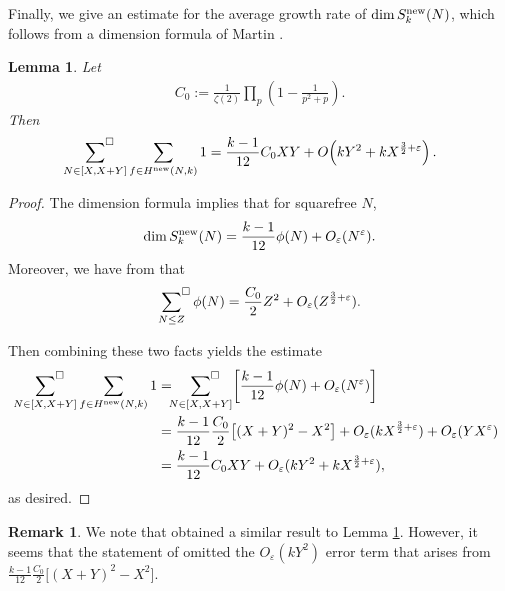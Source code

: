 \documentclass[12pt,letterpaper,reqno]{amsart}
\theoremstyle{plain}
\newtheorem{lemma}[theorem]{Lemma}
\theoremstyle{definition}
\newtheorem{remark}[theorem]{Remark}
\numberwithin{equation}{section}
\numberwithin{figure}{section}
\numberwithin{table}{section}
\newcommand{\lrp}[1]{\!\left(#1\right)}
\newcommand{\lrb}[1]{\!\left[#1\right]}
\newcommand{\new}{{\rm new}}
\newcommand{\nw}{{\rm new}}
\begin{document}
Finally, we give an estimate for the average growth rate of $\dim S_k^\nw(N)$, which follows from a dimension formula of Martin \cite[Theorem 1]{Martin}.
\begin{lemma}
    \label{lem:dimension-estimate}
    Let 
    \begin{align}
        C_0 := \frac{1}{\zeta(2)} \prod_p \lrp{1- \frac{1}{p^2+p}}.
    \end{align}
    Then
    \begin{align}
        \sideset{}{^\square} \sum_{\substack{N \in [X, X+Y]}} \sum_{f \in H^\new(N,k)} 1
        &= \frac{k-1}{12} C_0 XY + O\lrp{kY^2 + kX^{\frac{3}{2}+\varepsilon}}.
    \end{align}
\end{lemma}
\begin{proof}
    The dimension formula \cite[Theorem 1]{Martin} implies that for squarefree $N$,
    \begin{align} \label{eqn:dim-formula-for-SknewN}
        \dim S_k^\nw(N) = \frac{k-1}{12} \phi(N) + O_\varepsilon(N^\varepsilon).
    \end{align}
    Moreover, we have from \cite[Lemma 3.21]{Zubrilina} that
    \begin{align}
        \sideset{}{^\square} \sum_{N\le Z} \phi(N) = \frac{C_0}{2} Z^2 + O_\varepsilon(Z^{\frac{3}{2}+\varepsilon}).
    \end{align}
    
    Then combining these two facts yields the estimate
    \begin{align}
        \sideset{}{^\square} \sum_{\substack{N \in [X, X+Y]}} \sum_{f \in H^\new(N,k)} 1
        &= \sideset{}{^\square} \sum_{\substack{N \in [X, X+Y]}} \lrb{
            \frac{k-1}{12} \phi(N) + O_\varepsilon(N^\varepsilon)
        }\\
        &= \frac{k-1}{12} \frac{C_0}{2} \lrb{(X+Y)^2 - X^2} + O_\varepsilon(k X^{\frac{3}{2}+\varepsilon}) + O_\varepsilon(YX^\varepsilon) \\
        &= \frac{k-1}{12} C_0 XY + O_\varepsilon(kY^2 + k X^{\frac{3}{2}+\varepsilon}),
    \end{align}
    as desired.
\end{proof}

\begin{remark}
    We note that \cite[Equation (22)]{Zubrilina} obtained a similar result to Lemma \ref{lem:dimension-estimate}. However, it seems that the statement of \cite[Equation (22)]{Zubrilina} omitted the $O_\varepsilon(kY^2)$ error term that arises from $\frac{k-1}{12} \frac{C_0}{2} \big[(X+Y)^2 - X^2\big]$.
\end{remark}
\end{document}
